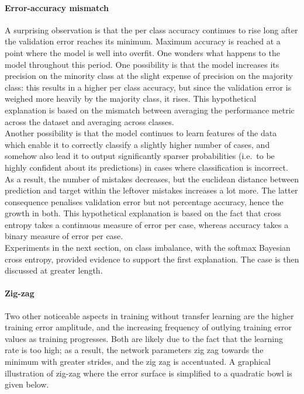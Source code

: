 \documentclass[a4paper,11pt]{article}
\begin{document}
\paragraph{Error-accuracy mismatch}

A surprising observation is that the per class accuracy continues to rise long after the validation error reaches its minimum. Maximum accuracy is reached at a point where the model is well into overfit. One wonders what happens to the model throughout this period. One possibility is that the model increases its precision on the minority class at the slight expense of precision on the majority class: this results in a higher per class accuracy, but since the validation error is weighed more heavily by the majority class, it rises. This hypothetical explanation is based on the mismatch between averaging the performance metric across the dataset and averaging across classes. \\

Another possibility is that the model continues to learn features of the data which enable it to correctly classify a slightly higher number of cases, and somehow also lead it to output significantly sparser probabilities (i.e.\ to be highly confident about its predictions) in cases where classification is incorrect. As a result, the number of mistakes decreases, but the euclidean distance between prediction and target within the leftover mistakes increases a lot more. The latter consequence penalises validation error but not percentage accuracy, hence the growth in both. This hypothetical explanation is based on the fact that cross entropy takes a continuous measure of error per case, whereas accuracy takes a binary measure of error per case. \\

Experiments in the next section, on class imbalance, with the softmax Bayesian cross entropy, provided evidence to support the first explanation. The case is then discussed at greater length.

\paragraph{Zig-zag}

Two other noticeable aspects in training without transfer learning are the higher training error amplitude, and the increasing frequency of outlying training error values as training progresses. Both are likely due to the fact that the learning rate is too high; as a result, the network parameters zig zag towards the minimum with greater strides, and the zig zag is accentuated. A graphical illustration of zig-zag where the error surface is simplified to a quadratic bowl is given below. 
\end{document}
